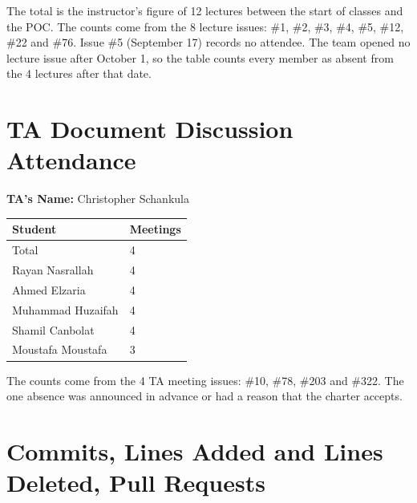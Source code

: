 \documentclass{article}
\begin{document}
The total is the instructor's figure of 12 lectures between the start of
classes and the POC. The counts come from the 8 lecture issues: \#1, \#2,
\#3, \#4, \#5, \#12, \#22 and \#76. Issue \#5 (September 17) records no
attendee. The team opened no lecture issue after October 1, so the table
counts every member as absent from the 4 lectures after that date.

\section{TA Document Discussion Attendance}

\noindent \textbf{TA's Name: } Christopher Schankula

\begin{table}[H]
\centering
\begin{tabular}{ll}
\toprule
\textbf{Student} & \textbf{Meetings}\\
\midrule
Total & 4\\
Rayan Nasrallah & 4\\
Ahmed Elzaria & 4\\
Muhammad Huzaifah & 4\\
Shamil Canbolat & 4\\
Moustafa Moustafa & 3\\
\bottomrule
\end{tabular}
\end{table}

The counts come from the 4 TA meeting issues: \#10, \#78, \#203 and \#322.
The one absence was announced in advance or had a reason that the charter
accepts.

\section{Commits, Lines Added and Lines Deleted, Pull Requests}

\begin{table}[H]
\centering
{}
\end{table}
\end{document}
